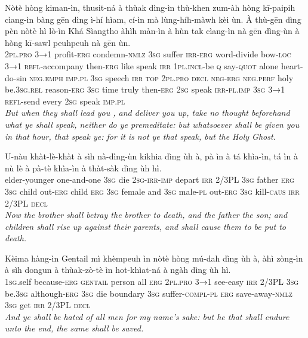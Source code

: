 \documentclass[11pt,a4paper]{article}
\begin{document}
\begin{exe}
\gll Nòtè hòng kiman-ìn, thusit-ná à thùak dìng-ìn thù-khen zum-àh hòng kī-paipih cìang-ìn bàng gēn dìng ì-hí hìam, cí-ìn mà lùng-híh-màwh kèi ùn. À thù-gēn dìng pèn nòtè hì lò-ìn Khá Sìangtho àhìh màn-ìn à hùn tak cìang-ìn nà gēn dìng-ùn à hòng kī-sawl peuhpeuh nà gēn ùn. \\
     \textsc{2pl}.\textsc{pro} \textsc{3→1} profit-\textsc{erg} condemn-\textsc{nmlz} \textsc{3sg} suffer \textsc{irr}-\textsc{erg} word-divide bow-\textsc{loc} \textsc{3→1} \textsc{refl}-accompany then-\textsc{erg} like speak \textsc{irr} \textsc{1pl}.\textsc{incl}-be \textsc{q} say-\textsc{quot} alone heart-do-sin \textsc{neg}.\textsc{emph} \textsc{imp}.\textsc{pl} \textsc{3sg} speech \textsc{irr} \textsc{top} \textsc{2pl}.\textsc{pro} \textsc{decl} \textsc{neg}-\textsc{erg} \textsc{neg}.\textsc{perf} holy be.\textsc{3sg}.\textsc{rel} reason-\textsc{erg} \textsc{3sg} time truly then-\textsc{erg} \textsc{2sg} speak \textsc{irr}-\textsc{pl}.\textsc{imp} \textsc{3sg} \textsc{3→1} \textsc{refl}-send every \textsc{2sg} speak \textsc{imp}.\textsc{pl} \\
\glt \textcolor{kjvcolor}{\textit{But when they shall lead you , and deliver you up, take no thought beforehand what ye shall speak, neither do ye premeditate: but whatsoever shall be given you in that hour, that speak ye: for it is not ye that speak, but the Holy Ghost.}}

\gll U-nàu khàt-lè-khàt à sìh nà-dìng-ùn kikhia dìng ùh à, pà ìn à tá khìa-ìn, tá ìn à nù lè à pà-tè khìa-ìn à thàt-sàk dìng ùh hì. \\
     elder-younger one-and-one \textsc{3sg} die \textsc{2sg}-\textsc{irr}-\textsc{imp} depart \textsc{irr} 2/3PL \textsc{3sg} father \textsc{erg} \textsc{3sg} child out-\textsc{erg} child \textsc{erg} \textsc{3sg} female and \textsc{3sg} male-\textsc{pl} out-\textsc{erg} \textsc{3sg} kill-\textsc{caus} \textsc{irr} 2/3PL \textsc{decl} \\
\glt \textcolor{kjvcolor}{\textit{Now the brother shall betray the brother to death, and the father the son; and children shall rise up against their parents, and shall cause them to be put to death.}}

\gll Kèima hàng-ìn Gentail mì khèmpeuh ìn nòtè hòng mú-dah dìng ùh à, àhì zòng-ìn à sìh dongun à thùak-zò-tè ìn hot-khìat-ná à ngàh dìng ùh hì. \\
     \textsc{1sg}.self because-\textsc{erg} \textsc{gentail} person all \textsc{erg} \textsc{2pl}.\textsc{pro} \textsc{3→1} see-easy \textsc{irr} 2/3PL \textsc{3sg} be.\textsc{3sg} although-\textsc{erg} \textsc{3sg} die boundary \textsc{3sg} suffer-\textsc{compl}-\textsc{pl} \textsc{erg} save-away-\textsc{nmlz} \textsc{3sg} get \textsc{irr} 2/3PL \textsc{decl} \\
\glt \textcolor{kjvcolor}{\textit{And ye shall be hated of all men for my name's sake: but he that shall endure unto the end, the same shall be saved.}}


\end{exe}
\end{document}
